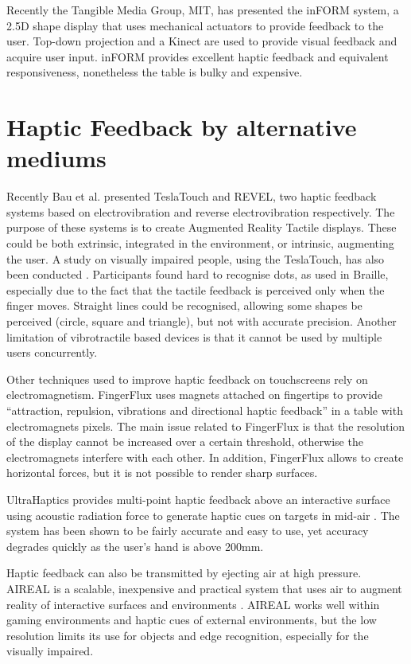Recently the Tangible Media Group, MIT, has presented the inFORM system, a 2.5D shape display that uses mechanical actuators to provide feedback to the user\cite{follmer2013inform}. Top-down projection and a Kinect are used to provide visual feedback and acquire user input. inFORM provides excellent haptic feedback and equivalent responsiveness, nonetheless the table is bulky and expensive.

\section{Haptic Feedback by alternative mediums}

Recently Bau et al. presented TeslaTouch\cite{bau2010teslatouch} and REVEL\cite{bau2012revel}, two haptic feedback systems based on electrovibration and reverse electrovibration respectively. The purpose of these systems is to create Augmented Reality Tactile displays. These could be both extrinsic, integrated in the environment, or intrinsic, augmenting the user. A study on visually impaired people, using the TeslaTouch, has also been conducted \cite{xu2011tactile}. Participants found hard to recognise dots, as used in Braille, especially due to the fact that the tactile feedback is perceived only when the finger moves. Straight lines could be recognised, allowing some shapes be perceived (circle, square and triangle), but not with accurate precision. Another limitation of vibrotractile based devices is that it cannot be used by multiple users concurrently. 

Other techniques used to improve haptic feedback on touchscreens rely on electromagnetism. FingerFlux \cite{weiss2011fingerflux} uses magnets attached on fingertips to provide ``attraction, repulsion, vibrations and directional haptic feedback'' in a table with electromagnets pixels. The main issue related to FingerFlux is that the resolution of the display cannot be increased over a certain threshold, otherwise the electromagnets interfere with each other. In addition, FingerFlux allows to create horizontal forces, but it is not possible to render sharp surfaces.    

UltraHaptics provides multi-point haptic feedback above an interactive surface using acoustic radiation force to generate haptic cues on targets in mid-air \cite{carter2013ultrahaptics}. The system has been shown to be fairly accurate and easy to use, yet accuracy degrades quickly as the user's hand is above 200mm. 

Haptic feedback can also be transmitted by ejecting air at high pressure. AIREAL is a scalable, inexpensive and practical system that uses air to augment reality of interactive surfaces and environments \cite{sodhi2013aireal}. AIREAL works well within gaming environments and haptic cues of external environments, but the low resolution limits its use for objects and edge recognition, especially for the visually impaired.
